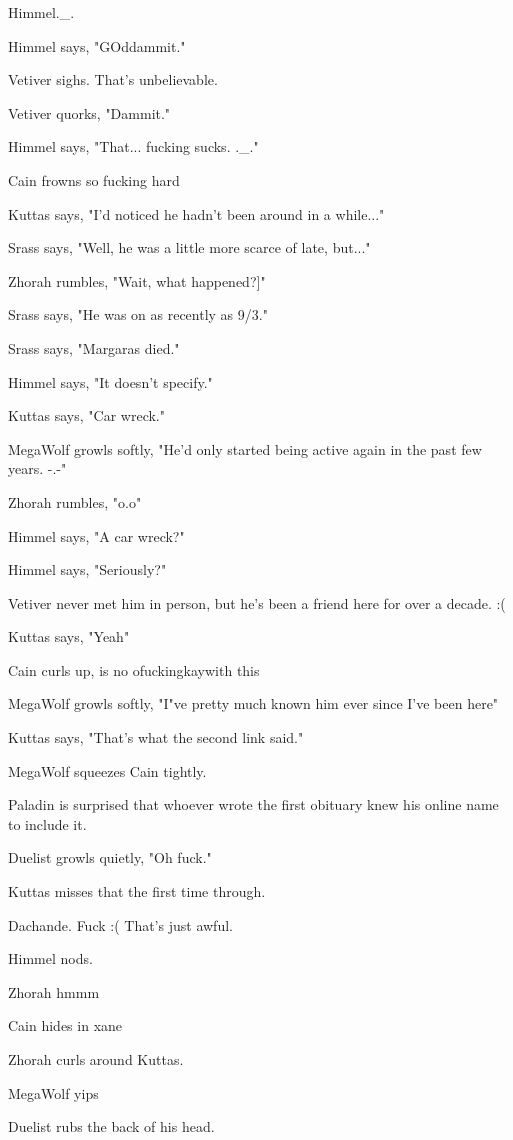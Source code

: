 Himmel.\_.

Himmel says, "GOddammit."

Vetiver sighs. That's unbelievable.

Vetiver quorks, "Dammit."

Himmel says, "That... fucking sucks. .\_."

Cain frowns so fucking hard

Kuttas says, "I'd noticed he hadn't been around in a while..."

Srass says, "Well, he was a little more scarce of late, but..."

Zhorah rumbles, "Wait, what happened?]"

Srass says, "He was on as recently as 9/3."

Srass says, "Margaras died."

Himmel says, "It doesn't specify."

Kuttas says, "Car wreck."

MegaWolf growls softly, "He'd only started being active again in the past few years. -.-"

Zhorah rumbles, "o.o"

Himmel says, "A car wreck?"

Himmel says, "Seriously?"

Vetiver never met him in person, but he's been a friend here for over a decade. :(

Kuttas says, "Yeah"

Cain curls up, is no ofuckingkaywith this

MegaWolf growls softly, "I"ve pretty much known him ever since I've been here"

Kuttas says, "That's what the second link said."

MegaWolf squeezes Cain tightly.

Paladin is surprised that whoever wrote the first obituary knew his online name to include it.

Duelist growls quietly, "Oh fuck."

Kuttas misses that the first time through.

Dachande. Fuck :( That's just awful.

Himmel nods.

Zhorah hmmm

Cain hides in xane

Zhorah curls around Kuttas.

MegaWolf yips

Duelist rubs the back of his head.

